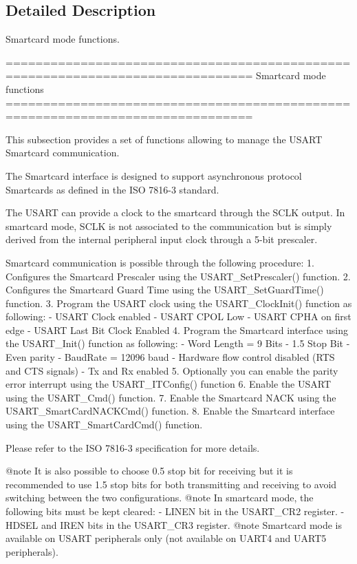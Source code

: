 \subsection{Detailed Description}
Smartcard mode functions. 

\begin{DoxyVerb} ===============================================================================
                               Smartcard mode functions
 ===============================================================================  

  This subsection provides a set of functions allowing to manage the USART 
  Smartcard communication.
  
  The Smartcard interface is designed to support asynchronous protocol Smartcards as
  defined in the ISO 7816-3 standard.

  The USART can provide a clock to the smartcard through the SCLK output.
  In smartcard mode, SCLK is not associated to the communication but is simply derived 
  from the internal peripheral input clock through a 5-bit prescaler.

  Smartcard communication is possible through the following procedure:
     1. Configures the Smartcard Prescaler using the USART_SetPrescaler() function.
     2. Configures the Smartcard Guard Time using the USART_SetGuardTime() function.
     3. Program the USART clock using the USART_ClockInit() function as following:
        - USART Clock enabled
        - USART CPOL Low
        - USART CPHA on first edge
        - USART Last Bit Clock Enabled
     4. Program the Smartcard interface using the USART_Init() function as following:
        - Word Length = 9 Bits
        - 1.5 Stop Bit
        - Even parity
        - BaudRate = 12096 baud
        - Hardware flow control disabled (RTS and CTS signals)
        - Tx and Rx enabled
     5. Optionally you can enable the parity error interrupt using the USART_ITConfig()
        function
     6. Enable the USART using the USART_Cmd() function.
     7. Enable the Smartcard NACK using the USART_SmartCardNACKCmd() function.
     8. Enable the Smartcard interface using the USART_SmartCardCmd() function.

  Please refer to the ISO 7816-3 specification for more details.


@note It is also possible to choose 0.5 stop bit for receiving but it is recommended 
      to use 1.5 stop bits for both transmitting and receiving to avoid switching 
      between the two configurations.
@note In smartcard mode, the following bits must be kept cleared:
        - LINEN bit in the USART_CR2 register.
        - HDSEL and IREN bits in the USART_CR3 register.
@note Smartcard mode is available on USART peripherals only (not available on UART4 
      and UART5 peripherals).\end{DoxyVerb}
 

